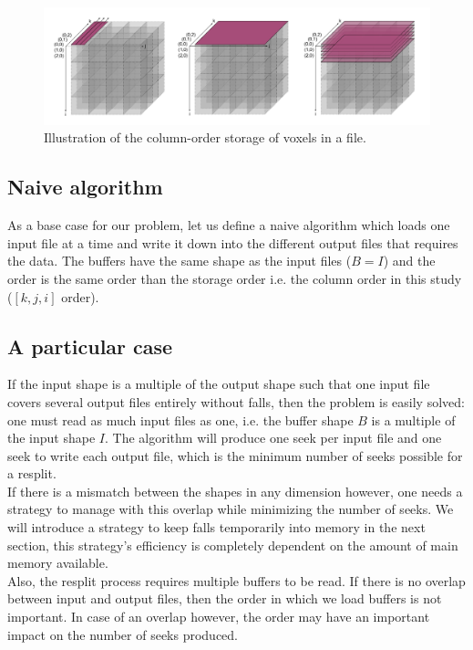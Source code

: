 \documentclass[conference]{IEEEtran}
\begin{document}
\begin{figure}[h!]
\centering
\includegraphics[scale=0.3]{./figures/column_order.png}
\caption{Illustration of the column-order storage of voxels in a file.
}
\label{fig:column_order}
\end{figure}

\subsection{Naive algorithm}

As a base case for our problem, let us define a naive algorithm which loads one input file at a time and write it down into the different output files that requires the data.
The buffers have the same shape as the input files ($B=I$) and the order is the same order than the storage order i.e. the column order in this study ($[k, j, i]$ order).

\subsection{A particular case}

If the input shape is a multiple of the output shape such that one input file covers several output files entirely without falls, then the problem is easily solved: one must read as much input files as one, i.e. the buffer shape $B$ is a multiple of the input shape $I$.
The algorithm will produce one seek per input file and one seek to write each output file, which is the minimum number of seeks possible for a resplit.\\

If there is a mismatch between the shapes in any dimension however, one needs a strategy to manage with this overlap while minimizing the number of seeks.
We will introduce a strategy to keep falls temporarily into memory in the next section, this strategy's efficiency is completely dependent on the amount of main memory available. \\

Also, the resplit process requires multiple buffers to be read.
If there is no overlap between input and output files, then the order in which we load buffers is not important.
In case of an overlap however, the order may have an important impact on the number of seeks produced.
\end{document}
